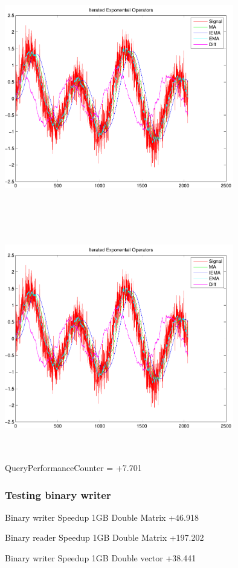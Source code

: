 \documentclass[9pt]{article}
\theoremstyle{plain}
\theoremstyle{definition}
\theoremstyle{remark}
\numberwithin{equation}{section}
\begin{document}
\includegraphics[width=10.0cm,height=10.0cm]{IteratedExponentailOperators.pdf}

\includegraphics[width=10.0cm,height=10.0cm]{IteratedExponentailOperators.pdf}

QueryPerformanceCounter  =  +7.701
\subsubsection{Testing binary writer}
Binary writer Speedup 1GB Double Matrix +46.918

Binary reader Speedup 1GB Double Matrix +197.202

Binary writer Speedup 1GB Double vector +38.441
\end{document}
